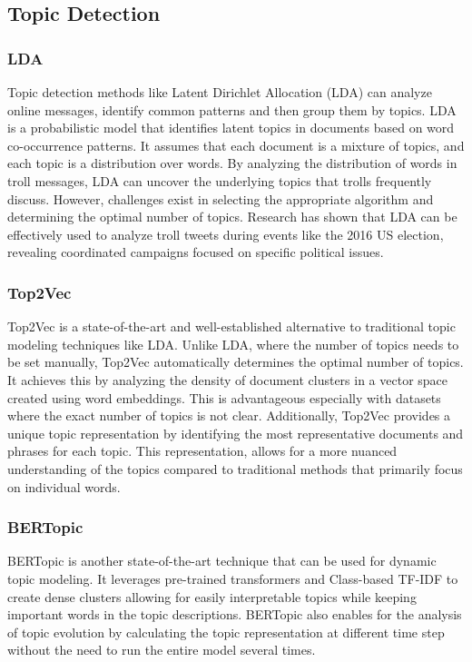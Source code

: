 \documentclass[twoside]{ctuthesis}
\theoremstyle{plain}
\theoremstyle{definition}
\theoremstyle{note}
\begin{document}
\section{Topic Detection}

\subsection{LDA}
Topic detection methods like Latent Dirichlet Allocation (LDA) can analyze online messages, identify common patterns and then group them by topics. LDA is a probabilistic model that identifies latent topics in documents based on word co-occurrence patterns.\cite{Blei2001LDA} It assumes that each document is a mixture of topics, and each topic is a distribution over words. By analyzing the distribution of words in troll messages, LDA can uncover the underlying topics that trolls frequently discuss. However, challenges exist in selecting the appropriate algorithm and determining the optimal number of topics.\cite{Ruediger2022TopicModellingRevisited} Research has shown that LDA can be effectively used to analyze troll tweets during events like the 2016 US election, revealing coordinated campaigns focused on specific political issues.\cite{Golino2022Elections}

\subsection{Top2Vec}
Top2Vec is a state-of-the-art and well-established alternative to traditional topic modeling techniques like LDA. Unlike LDA, where the number of topics needs to be set manually, Top2Vec automatically determines the optimal number of topics. It achieves this by analyzing the density of document clusters in a vector space created using word embeddings. This is advantageous especially with datasets where the exact number of topics is not clear. Additionally, Top2Vec provides a unique topic representation by identifying the most representative documents and phrases for each topic. This representation, allows for a more nuanced understanding of the topics compared to traditional methods that primarily focus on individual words.\cite{Angelov2024}

\subsection{BERTopic}
BERTopic is another state-of-the-art technique that can be used for dynamic topic modeling. It leverages pre-trained transformers and Class-based TF-IDF to create dense clusters allowing for easily interpretable topics while keeping important words in the topic descriptions. BERTopic also enables for the analysis of topic evolution by calculating the topic representation at different time step without the need to run the entire model several times.\cite{Grootendorst2022BERTopic}



\chapter{}



\appendix

\printindex



\end{document}
